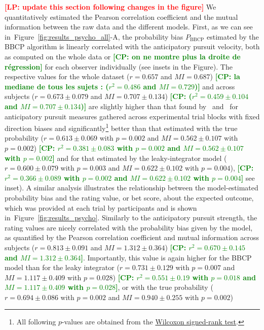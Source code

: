 \documentclass[10pt,letterpaper]{article}
\newcommand{\citet}[1]{\cite{#1}}
\newcommand{\seeFig}[1]{Figure~\ref{fig:#1}}
\newcommand{\LP}[1]{\textbf{\textcolor{red}{[LP: #1]}}}
\newcommand{\CP}[1]{\textbf{\textcolor{green}{[CP: #1]}}}
\begin{document}
\LP{update this section following changes in the figure}
We quantitatively estimated the Pearson correlation coefficient
and the mutual information
between the raw data and the different models.
First, as we can see in~\seeFig{results_psycho_all}-A,
the probability bias $P_{\text{BBCP}}$ estimated by the BBCP algorithm
is linearly correlated with the anticipatory pursuit velocity, both as computed on the whole data or \CP{on ne montre plus la droite de régression}
for each observer individually (see insets in the Figure).
The respective values for the whole dataset
($r = 0.657$ and $MI = 0.687$) \CP{la mediane de tous les sujets : ($r^{2} = 0.486$ and $MI = 0.729$)}
and across subjects
($r = 0.673 \pm 0.079$ and $MI =  0.707 \pm 0.134$) %
\CP{($r^2 = 0.459 \pm 0.104$ and $MI = 0.707 \pm 0.134$)}
are slightly higher than that found by~\citet{Montagnini2010} and~\citet{Damasse18}
for anticipatory pursuit measures gathered across experimental trial blocks with fixed direction biases %
and significantly\footnote{All following $p$-values are obtained from the \href{https://docs.scipy.org/doc/scipy/reference/generated/scipy.stats.wilcoxon.html}{Wilcoxon signed-rank test}.} better than that estimated
with the true probability
($r = 0.613 \pm 0.069$ with $p=0.002$ and $MI = 0.562 \pm 0.107$ with $p=0.002$) %
\CP{$r^{2} = 0.381 \pm 0.083$ with $p=0.002$
and $MI = 0.562 \pm 0.107$ with $p=0.002$}
and for that estimated by the leaky-integrator model
($r = 0.600 \pm 0.079$ with $p=0.003$ and $MI =  0.622 \pm 0.102$ with $p=0.004$),
\CP{$r^{2} = 0.366 \pm 0.089$ with $p=0.002$ and $MI = 0.622 \pm 0.102$ with $p=0.004$}
see inset).
A similar analysis
illustrates the relationship between
the model-estimated probability bias
and the rating value, or bet score, about the expected outcome, which was provided at each trial
by participants
and is shown in~\seeFig{results_psycho}.
Similarly to the anticipatory pursuit strength, the rating values are nicely correlated
with the probability bias given by the model,
as quantified by the Pearson correlation coefficient and mutual information
across subjects ($r = 0.813 \pm 0.091$ and $MI = 1.312 \pm 0.364$)
\CP{$r^{2} = 0.670 \pm 0.145$ and $MI = 1.312 \pm 0.364$}.
Importantly, this value is again higher for the BBCP model than
for the leaky integrator ($r = 0.731 \pm 0.129$ with $p=0.007$ and $MI =  1.117 \pm 0.409$ with $p=0.028$)
\CP{$r^{2} = 0.551 \pm 0.19$ with $p=0.018$ and $MI = 1.117 \pm 0.409$ with $p=0.028$},
or with the true probability ($r = 0.694 \pm 0.086$ with $p=0.002$ and $MI =  0.940 \pm 0.255$ with $p=0.002$)
\end{document}
